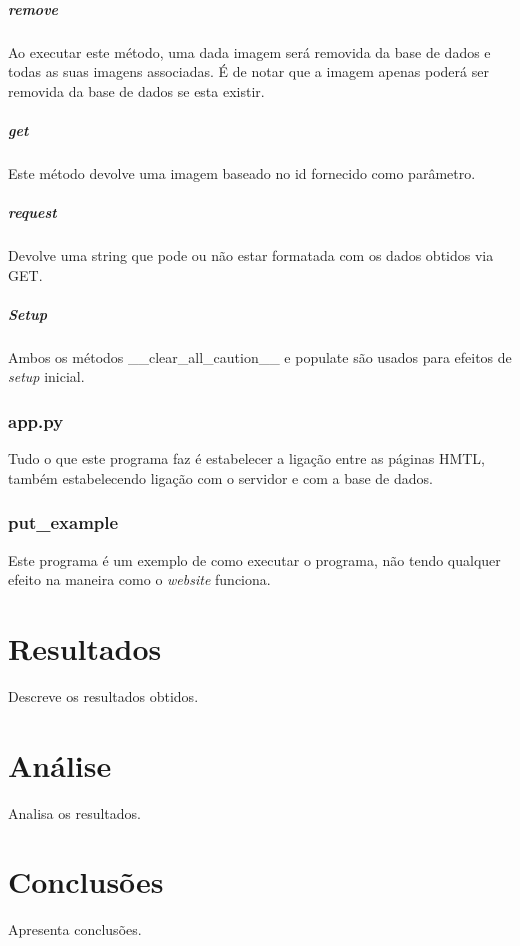 \documentclass{report}
\begin{document}
\paragraph{remove}
Ao executar este método, uma dada imagem será removida da base de dados e todas as suas imagens associadas. É de notar que a imagem apenas poderá ser removida da base de dados se esta existir.

\paragraph{get}
Este método devolve uma imagem baseado no id fornecido como parâmetro. 

\paragraph{request}
Devolve uma string que pode ou não estar formatada com os dados obtidos via GET.

\paragraph{Setup}
Ambos os métodos \_\_clear\_all\_caution\_\_ e  populate são usados para efeitos de \textit{setup} inicial.

\subsection{app.py}
Tudo o que este programa faz é estabelecer a ligação entre as páginas HMTL, também estabelecendo ligação com o servidor e com a base de dados. 

\subsection{put\_example}
Este programa é um exemplo de como executar o programa, não tendo qualquer efeito na maneira como o \textit{website} funciona.

\chapter{Resultados}
\label{chap.resultados}
Descreve os resultados obtidos.

\chapter{Análise}
\label{chap.analise}
Analisa os resultados.

\chapter{Conclusões}
\label{chap.conclusao}
Apresenta conclusões.
\end{document}
